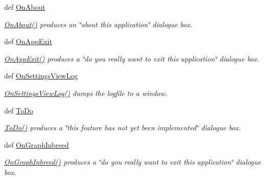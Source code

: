 \begin{DoxyCompactItemize}
def \hyperlink{classPyPedal_1_1pyp__gui_1_1MainWindow_a259ea30650dc0bca380dbe14c252e36d}{OnAbout}
\begin{DoxyCompactList}\small\item\em \hyperlink{classPyPedal_1_1pyp__gui_1_1MainWindow_a259ea30650dc0bca380dbe14c252e36d}{OnAbout()} produces an \char`\"{}about this application\char`\"{} dialogue box. \item\end{DoxyCompactList}\item 
def \hyperlink{classPyPedal_1_1pyp__gui_1_1MainWindow_a32bedae6c29388bbc5878e58b5e6d59d}{OnAppExit}
\begin{DoxyCompactList}\small\item\em \hyperlink{classPyPedal_1_1pyp__gui_1_1MainWindow_a32bedae6c29388bbc5878e58b5e6d59d}{OnAppExit()} produces a \char`\"{}do you really want to exit this application\char`\"{} dialogue box. \item\end{DoxyCompactList}\item 
def \hyperlink{classPyPedal_1_1pyp__gui_1_1MainWindow_ab074d79a936f1596c15778e801eb9da7}{OnSettingsViewLog}
\begin{DoxyCompactList}\small\item\em \hyperlink{classPyPedal_1_1pyp__gui_1_1MainWindow_ab074d79a936f1596c15778e801eb9da7}{OnSettingsViewLog()} dumps the logfile to a window. \item\end{DoxyCompactList}\item 
def \hyperlink{classPyPedal_1_1pyp__gui_1_1MainWindow_a4b5adafe34e9923eac05fb61bf1494f2}{ToDo}
\begin{DoxyCompactList}\small\item\em \hyperlink{classPyPedal_1_1pyp__gui_1_1MainWindow_a4b5adafe34e9923eac05fb61bf1494f2}{ToDo()} produces a \char`\"{}this feature has not yet been implemented\char`\"{} dialogue box. \item\end{DoxyCompactList}\item 
def \hyperlink{classPyPedal_1_1pyp__gui_1_1MainWindow_a81cca0ed359f097967bd5e454a050ae0}{OnGraphInbreed}
\begin{DoxyCompactList}\small\item\em \hyperlink{classPyPedal_1_1pyp__gui_1_1MainWindow_a81cca0ed359f097967bd5e454a050ae0}{OnGraphInbreed()} produces a \char`\"{}do you really want to exit this application\char`\"{} dialogue box. \item\end{DoxyCompactList}\item 

\end{DoxyCompactItemize}
